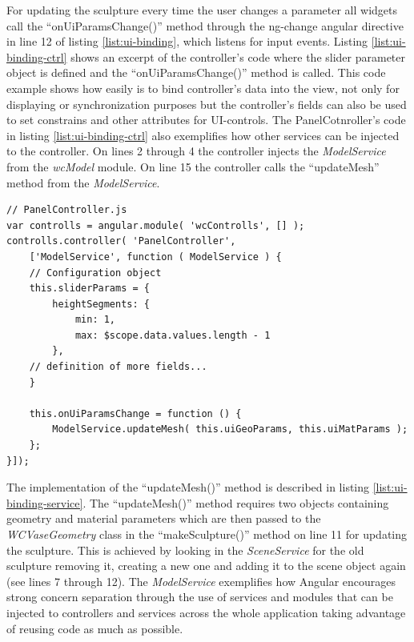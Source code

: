 \documentclass[../medieninformatik-arbeit.tex]{subfiles}
\begin{document}
For updating the sculpture every time the user changes a parameter all widgets call the ``onUiParamsChange()'' method through the ng-change angular directive in line 12 of listing \ref{list:ui-binding}, which listens for input events. Listing \ref{list:ui-binding-ctrl} shows an excerpt of the controller's code where the slider parameter object is defined and the ``onUiParamsChange()'' method is called. This code example shows how easily is to bind controller's data into the view, not only for displaying or synchronization purposes but the controller's fields can also be used to set constrains and other attributes for UI-controls. The PanelCotnroller's code in listing \ref{list:ui-binding-ctrl} also exemplifies how other services can be injected to the controller. On lines 2 through 4 the controller injects the \textit{ModelService} from the \textit{wcModel} module. On line 15 the controller calls the ``updateMesh'' method from the \textit{ModelService}. 

\begin{lstlisting}[style=htmlcssjs, caption={Binded controller data and the called controller function from the view},label=list:ui-binding-ctrl]
// PanelController.js
var controlls = angular.module( 'wcControlls', [] );
controlls.controller( 'PanelController', 
	['ModelService', function ( ModelService ) {
	// Configuration object 
	this.sliderParams = {
	    heightSegments: {
	    	min: 1,
	        max: $scope.data.values.length - 1
	    },    
	// definition of more fields...        	
	}
    
	this.onUiParamsChange = function () {
		ModelService.updateMesh( this.uiGeoParams, this.uiMatParams );
	};
}]);	
\end{lstlisting}

The implementation of the ``updateMesh()'' method is described in listing \ref{list:ui-binding-service}. The ``updateMesh()'' method requires two objects containing geometry and material parameters which are then passed to the \textit{WCVaseGeometry} class in the ``makeSculpture()'' method on line 11 for updating the sculpture. This is achieved by looking in the \textit{SceneService} for the old sculpture removing it, creating a new one and adding it to the scene object again (see lines 7 through 12). The \textit{ModelService} exemplifies how Angular encourages strong concern separation through the use of services and modules that can be injected to controllers and services across the whole application taking advantage of reusing code as much as possible. 
\end{document}
